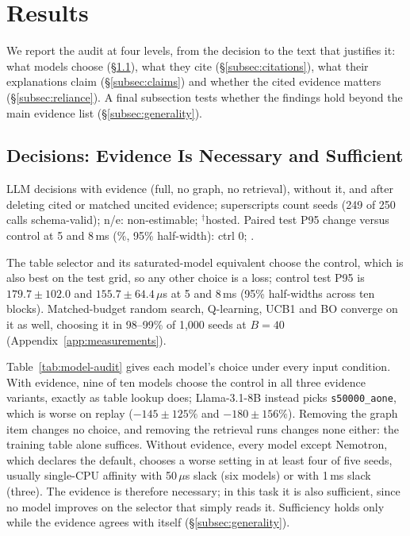 \section{Results}
\label{sec:results}
\label{subsec:followup}
We report the audit at four levels, from the decision to the text that justifies it: what models choose (\S\ref{subsec:decisions}), what they cite (\S\ref{subsec:citations}), what their explanations claim (\S\ref{subsec:claims}) and whether the cited evidence matters (\S\ref{subsec:reliance}). A final subsection tests whether the findings hold beyond the main evidence list (\S\ref{subsec:generality}).

\subsection{Decisions: Evidence Is Necessary and Sufficient}
\label{subsec:decisions}
\begin{table}[t]
\centering\footnotesize\setlength{\tabcolsep}{2.5pt}
\caption{LLM decisions with evidence (full, no graph, no retrieval), without it, and after deleting cited or matched uncited evidence; superscripts count seeds (249 of 250 calls schema-valid); n/e: non-estimable; $^\dagger$hosted. Paired test P95 change versus control at 5 and 8\,ms (\%, 95\% half-width): ctrl 0; \protect\unskip.}
\label{tab:model-audit}
\begin{adjustbox}{max width=\columnwidth}

\end{adjustbox}
\end{table}

The table selector and its saturated-model equivalent choose the control, which is also best on the test grid, so any other choice is a loss; control test P95 is $179.7\pm102.0$ and $155.7\pm64.4\,\mu$s at 5 and 8\,ms (95\% half-widths across ten blocks). Matched-budget random search, Q-learning, UCB1 and BO converge on it as well, choosing it in 98--99\% of 1,000 seeds at $B=40$ (Appendix~\ref{app:measurements}).

Table~\ref{tab:model-audit} gives each model's choice under every input condition. With evidence, nine of ten models choose the control in all three evidence variants, exactly as table lookup does; Llama-3.1-8B instead picks \texttt{s50000\_aone}, which is worse on replay ($-145\pm125\%$ and $-180\pm156\%$). Removing the graph item changes no choice, and removing the retrieval runs changes none either: the training table alone suffices. Without evidence, every model except Nemotron, which declares the default, chooses a worse setting in at least four of five seeds, usually single-CPU affinity with 50\,$\mu$s slack (six models) or with 1\,ms slack (three). The evidence is therefore necessary; in this task it is also sufficient, since no model improves on the selector that simply reads it. Sufficiency holds only while the evidence agrees with itself (\S\ref{subsec:generality}).

